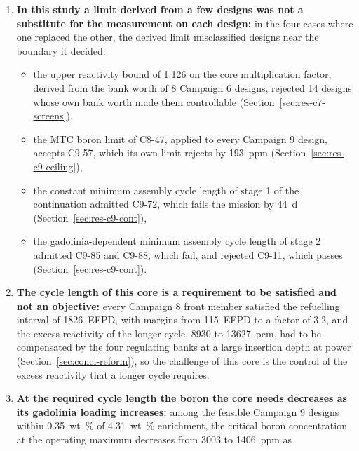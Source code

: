 \begin{enumerate}
  \item \textbf{In this study a limit derived from a few designs was not
        a substitute for the measurement on each design:} in the four
        cases where one replaced the other, the derived limit
        misclassified designs near the boundary it decided:
        \begin{itemize}
          \item the upper reactivity bound of 1.126 on the core
                multiplication factor, derived from the bank worth of 8
                Campaign 6 designs, rejected 14 designs whose own bank
                worth made them controllable
                (Section~\ref{sec:res-c7-screens}),
          \item the MTC boron limit of C8-47, applied to every
                Campaign 9 design, accepts C9-57, which its own limit
                rejects by \SI{193}{ppm} (Section~\ref{sec:res-c9-ceiling}),
                    \item the constant minimum assembly cycle length of stage 1
                of the continuation admitted C9-72, which fails the
                mission by \SI{44}{d} (Section~\ref{sec:res-c9-cont}),
          \item the gadolinia-dependent minimum assembly cycle length of
                stage 2 admitted C9-85 and C9-88, which fail, and
                rejected C9-11, which passes
                (Section~\ref{sec:res-c9-cont}).
        \end{itemize}
  \item \textbf{The cycle length of this core is a requirement to be
        satisfied and not an objective:} every Campaign 8 front member
        satisfied the refuelling interval of \SI{1826}{EFPD}, with
        margins from \SI{115}{EFPD} to a factor of 3.2, and the excess reactivity of
        the longer cycle, \num{8930} to \SI{13627}{pcm}, had to be
        compensated by the four regulating banks at a large insertion
        depth at power (Section~\ref{sec:concl-reform}), so the
        challenge of this core is the control of the excess reactivity
        that a longer cycle requires.
  \item \textbf{At the required cycle length the boron the core needs
        decreases as its gadolinia loading increases:} among the
        feasible Campaign 9 designs within \SI{0.35}{wt\%} of
        \SI{4.31}{wt\%} enrichment, the critical boron concentration at
        the operating maximum decreases from 3003 to \SI{1406}{ppm} as

\end{enumerate}
